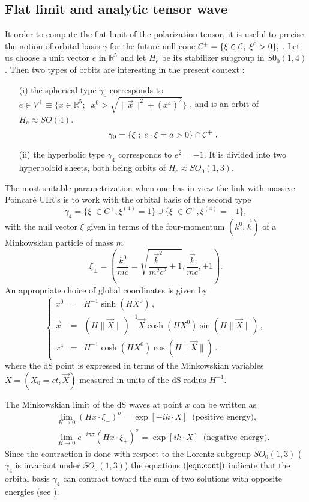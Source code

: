 \documentclass[a4paper,11pt,showpacs,preprintnumbers]{revtex4}
\def\setR{\mathbb{R}}
\begin{document}
\subsection{Flat limit and analytic tensor wave}
It order to compute the flat limit of the polarization tensor, it
is useful to precise the notion of orbital basis $\gamma$ for the
future null cone ${\cal C}^+=\{ \xi \in {\cal C};\; \xi^0>0\},$
\cite{brmo}. Let us choose a unit vector $e$ in $\setR ^{5}$ and
let $H_{e}$ be its stabilizer subgroup in $S0_{0}(1,4)$. Then two
types of orbits are interesting in the present context :
\begin{itemize}
\item[(i)] the spherical type $\gamma_{0}$ corresponds to $e\in V^{+}
\equiv \{ x\in \setR^5;\;\; x^0 >\sqrt{\parallel \vec
x\parallel^2+(x^4)^2} \}$ , and is an orbit of $H_{e}\approx
SO(4)$.
$$\gamma_{0}=\{\xi\;;\;e\cdot\xi=a>0\}\cap  {\cal C}^{+}\;.$$
\item[(ii)] the hyperbolic type  $\gamma_{4}$ corresponds to $e^{2}=-1$.
It is divided into two hyperboloid sheets, both being orbits of
$H_{e}\approx SO_{0}(1,3)$.
\end{itemize}
The most suitable parametrization when one has in view the link
with massive Poincar\'e UIR's is to work with the orbital basis of
the second type
$$\gamma_{4}=\{\xi\;\in C^{+},\xi^{(4)}=1 \}\cup\{\xi\;\in
C^{+},\xi^{(4)}=-1  \},$$ with the null vector $\xi$ given in
terms of the four-momentum $(k^0, \vec{k})$ of a Minkowskian
particle of mass $m$
\begin{equation}
\xi_{\pm}=\left(\frac{k^0}{mc}=\sqrt{\frac{\vec
k^2}{m^2c^2}+1},\frac{\vec k}{mc},\pm 1\right).
\end{equation}
An appropriate choice of global coordinates is given by
\begin{equation}
\left \{\begin{array}{rcllr}
x^0&=&  {\displaystyle H^{-1} \sinh (H X^0) }    \,,\\
\vec x &=&( H\parallel \vec X\parallel)^{-1}\vec X \cosh( HX^0)
\sin
(H\parallel \vec X\parallel) \,,\\
x^4&=&  H^{-1}\cosh( HX^0) \cos (H\parallel \vec X\parallel)\,.
\end{array}
\right.
\end{equation}
where the dS point is expressed in terms of the Minkowskian
variables $X=(X_0=ct, \vec X)$ measured in units of the dS radius
$H^{-1}$.

The Minkowskian limit of the dS  waves at point $x$ can be written
as \cite{brgamo}
\begin{eqnarray}
&&\lim_{H \rightarrow 0}(Hx\cdot\xi_{-})^{\sigma}
=\exp[-ik\cdot X]\; \;\mbox{(positive energy)},\nonumber\\
&&\lim_{H \rightarrow 0}e^{-i\pi \sigma}(Hx\cdot\xi_{+})^{\sigma}
= \exp[ik\cdot X] \;\;\mbox{(negative energy)} \label{eqn:cont}.
\end{eqnarray}
Since the contraction is done with respect to the Lorentz subgroup
$SO_{0}(1,3)$ ($\gamma_{4}$ is invariant under $SO_{0}(1,3)$) the
equations $(\ref{eqn:cont})$ indicate that the orbital basis
$\gamma_{4}$ can contract toward the sum of two solutions with
opposite energies (see \cite{mini}).
\end{document}
